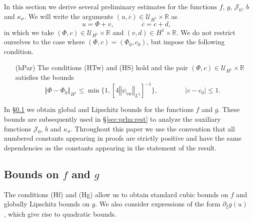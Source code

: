 \documentclass[10pt]{articleHJ}
\newcommand{\Real}{\mathbb{R}}							%
\newcommand{\abs}[1]{\left\vert#1\right\vert}			%
\newcommand{\norm}[1]{\left\Vert#1\right\Vert}		%
\numberwithin{equation}{section}
\begin{document}
In this section we derive several preliminary estimates
for the functions $f$,  $g$, $\mathcal{J}_0$, $b$ and $\kappa_{\sigma}$.
We will write the arguments
$(u, \overline{c}) \in \mathcal{U}_{H^1} \times \Real$
as
\begin{equation}
u = \Phi + v, \qquad \qquad \overline{c} = c + d,
\end{equation}
in which we take $(\Phi, c) \in \mathcal{U}_{H^1} \times \Real$
and $(v, d) \in H^1 \times \Real$.
%
We do not restrict ourselves to the case where $(\Phi,c) =(\Phi_0, c_0)$,
but impose the following condition.
%
\begin{itemize}
\item[(hPar)]{
 The conditions (HTw) and (HS) hold
 and the pair $(\Phi,c) \in \mathcal{U}_{H^1} \times \Real$
 satisfies the bounds
 \begin{equation}
    \norm{\Phi - \Phi_{0} }_{H^1} \le
      \min\{ 1 ,[4 \norm{\psi_{\mathrm{tw}}}_{L^2}]^{-1} \},
    \qquad \qquad
    \abs{c - c_0} \le 1.
  \end{equation}
}
\end{itemize}
%
In \S\ref{sec:prlm:fg} we obtain global and Lipschitz bounds
for the functions $f$ and $g$. These bounds
are subsequently used in \S\ref{sec:prlm:rest}
to analyze the auxiliary functions
$\mathcal{J}_0$, $b$ and $\kappa_{\sigma}$.
Throughout this paper we use the convention that all numbered constants appearing
in proofs are strictly positive and have the same dependencies as the
constants appearing in the statement of the result.




\subsection{Bounds on $f$ and $g$}
\label{sec:prlm:fg}

The conditions (Hf) and (Hg) allow us to obtain standard cubic
bounds on $f$
and globally Lipschitz bounds on $g$. We also consider
expressions of the form $\partial_{\xi} g(u)$,
which give rise to quadratic bounds.
\end{document}
